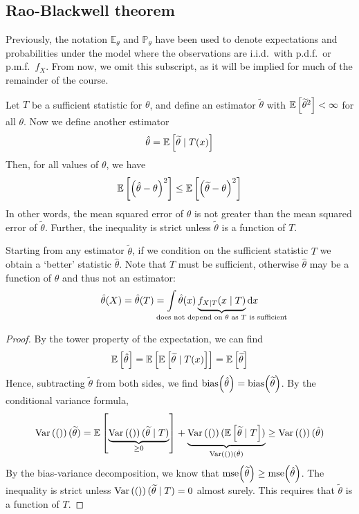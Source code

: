 \subsection{Rao-Blackwell theorem}
Previously, the notation \( \mathbb E_\theta \) and \( \mathbb P_\theta \) have been used to denote expectations and probabilities under the model where the observations are i.i.d.\ with p.d.f.\ or p.m.f.\ \( f_X \).
From now, we omit this subscript, as it will be implied for much of the remainder of the course.
\begin{theorem}
	Let \( T \) be a sufficient statistic for \( \theta \), and define an estimator \( \widetilde \theta \) with \( \mathbb{E}\left[{{\widetilde \theta}^2}\right] < \infty \) for all \( \theta \).
	Now we define another estimator
	\[ \hat \theta = \mathbb{E}\left[{\widetilde \theta \mid T(x)}\right] \]
	Then, for all values of \( \theta \), we have
	\[ \mathbb{E}\left[{\qty(\hat \theta - \theta)^2}\right] \leq \mathbb{E}\left[{\qty(\widetilde \theta - \theta)^2}\right] \]
	In other words, the mean squared error of \( \hat \theta \) is not greater than the mean squared error of \( \widetilde \theta \).
	Further, the inequality is strict unless \( \widetilde \theta \) is a function of \( T \).
\end{theorem}
\begin{remark}
	Starting from any estimator \( \widetilde \theta \), if we condition on the sufficient statistic \( T \) we obtain a `better' statistic \( \hat \theta \).
	Note that \( T \) must be sufficient, otherwise \( \hat \theta \) may be a function of \( \theta \) and thus not an estimator:
	\[ \hat \theta(X) = \hat \theta(T) = \int \hat \theta(x) \underbrace{f_{X \mid T}(x \mid T)}_{\mathclap{\text{does not depend on } \theta \text{ as } T \text{ is sufficient}}} \dd{x} \]
\end{remark}
\begin{proof}
	By the tower property of the expectation, we can find
	\[ \mathbb{E}\left[{\hat \theta}\right] = \mathbb{E}\left[{\mathbb{E}\left[{\widetilde \theta \mid T(x)}\right]}\right] = \mathbb{E}\left[{\widetilde \theta}\right] \]
	Hence, subtracting \( \widetilde \theta \) from both sides, we find \( \mathrm{bias}\qty(\hat\theta) = \mathrm{bias}\qty(\widetilde\theta) \).
	By the conditional variance formula,
	\[ \operatorname{Var}\left({\qty}\right)(\widetilde \theta) = \mathbb{E}\left[{\underbrace{\operatorname{Var}\left({\qty}\right)(\widetilde \theta \mid T)}_{\geq 0}}\right] + \underbrace{\operatorname{Var}\left({\qty}\right)(\mathbb{E}\left[{\widetilde \theta \mid T}\right])}_{\operatorname{Var}\left({\qty}\right)(\hat\theta)} \geq \operatorname{Var}\left({\qty}\right)(\hat \theta) \]
	By the bias-variance decomposition, we know that \( \mathrm{mse}\qty(\widetilde \theta) \geq \mathrm{mse}\qty(\hat \theta) \).
	The inequality is strict unless \( \operatorname{Var}\left({\qty}\right)(\widetilde \theta \mid T) = 0 \) almost surely.
	This requires that \( \widetilde \theta \) is a function of \( T \).
\end{proof}
